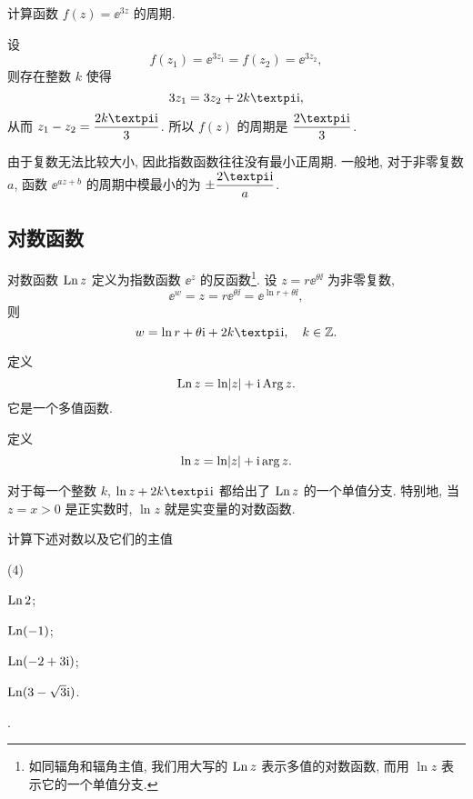 \begin{example}
  计算函数 $f(z)=\ee^{3z}$ 的周期.
\end{example}

\begin{solution}
  设
  \[
     f(z_1)=\ee^{3z_1}
    =f(z_2)=\ee^{3z_2},
  \]
  则存在整数 $k$ 使得
  \[
    3z_1=3z_2+2k\cpi\ii,
  \]
  从而 $z_1-z_2=\dfrac{2k\cpi\ii}3$.
  所以 $f(z)$ 的周期是 $\dfrac{2\cpi\ii}3$.
\end{solution}

由于复数无法比较大小, 因此指数函数往往没有最小正周期.
一般地, 对于非零复数 $a$, 函数 $\ee^{az+b}$ 的周期中模最小的为 $\pm\dfrac{2\cpi\ii}a$.


\subsection{对数函数}

对数函数 $\operatorname{Ln} z$ 定义为指数函数 $\ee^z$ 的反函数\footnote{%
  如同辐角和辐角主值, 我们用大写的 $\operatorname{Ln} z$ 表示多值的对数函数, 而用 $\ln z$ 表示它的一个单值分支.
}.
设 $z=r\ee^{\theta \ii}$ 为非零复数,
\[
  \ee^w=z=r\ee^{\theta \ii}=\ee^{\ln r+\theta \ii},
\]
则
\[
  w=\ln r+\theta\ii+2k\cpi\ii,\quad k\in\BZ.
\]

\begin{definition}
  \begin{enuma}
    \item 定义
      \[
        \operatorname{Ln} z=\ln\lvert z\rvert+\mathrm{i}\operatorname{Arg} z.
      \]
      它是一个多值函数.
    \item 定义
      \[
        \ln z=\ln\lvert z\rvert+\mathrm{i}\arg z.
      \]
  \end{enuma}
\end{definition}

对于每一个整数 $k$, $\ln z+2k\cpi\ii$ 都给出了 $\operatorname{Ln} z$ 的一个单值分支.
特别地, 当 $z=x>0$ 是正实数时, $\ln z$ 就是实变量的对数函数.

\begin{example}
  计算下述对数以及它们的主值
  \begin{subexample}(4)
    \item $\operatorname{Ln} 2$;
    \item $\operatorname{Ln}(-1)$;
    \item $\operatorname{Ln}(-2+3\mathrm{i})$;
    \item $\operatorname{Ln}(3-\sqrt3 \mathrm{i})$.
  \end{subexample}.
\end{example}

